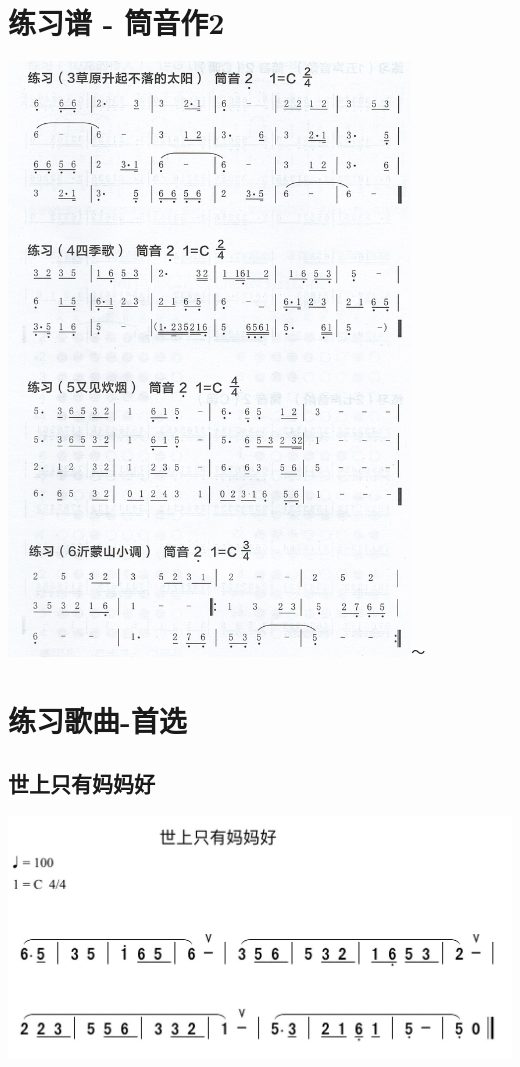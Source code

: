 \documentclass[cn,pad,chinese,chinesefont=nofont,math=newtx]{elegantbook}
\begin{document}
\chapter{练习谱 - 筒音作2}
	\includegraphics[width=0.8\textwidth]{dongxiao/Scan 6.jpeg}～

\chapter{练习歌曲-首选}
\section{世上只有妈妈好}
	\includegraphics[width=\textwidth]{dongxiao/IMG_0854-世上只有妈妈好.png}
\end{document}
